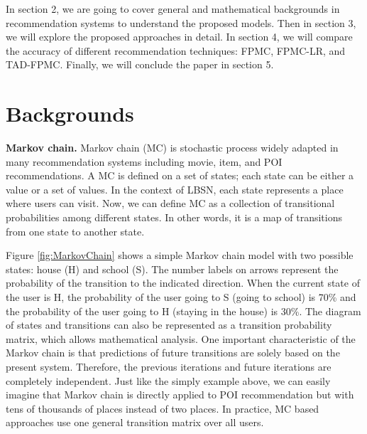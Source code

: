 \documentclass{sig-alternate}
\begin{document}
In section 2, we are going to cover general and mathematical backgrounds in recommendation systems 
to understand the proposed models. Then in section 3, we will explore the proposed approaches in detail. 
In section 4, we will compare the accuracy of different recommendation techniques: FPMC, FPMC-LR, and TAD-FPMC. 
Finally, we will conclude the paper in section 5.



\section{Backgrounds}
\label{sec:backgrounds}


\textbf{Markov chain.} Markov chain (MC) is stochastic process widely adapted in many recommendation systems 
including movie, item, and POI recommendations. A MC is defined on a set of states; each state can be either a value
or a set of values. In the context of LBSN, each state represents a place where users can visit.
Now, we can define MC as a collection of transitional probabilities among different states.
In other words, it is a map of transitions from one state to another state. 

Figure \ref{fig:MarkovChain} shows a simple Markov chain 
model with two possible states: house (H) and school (S). The number labels on arrows represent 
the probability of the transition to the indicated direction. When the current state of the 
user is H, the probability of the user going to S (going to school) is 70\% and the probability of the 
user going to H (staying in the house) is 30\%. The diagram of states and transitions can also be 
represented as a transition probability matrix, which allows mathematical analysis. One important 
characteristic of the Markov chain is that predictions of future transitions are solely based on the present 
system. Therefore, the previous iterations and future iterations are completely independent. 
Just like the simply example above, we can easily imagine that Markov chain is directly applied to 
POI recommendation but with tens of thousands of places instead of two places. In practice, MC based 
approaches use one general transition matrix over all users. 
\end{document}
